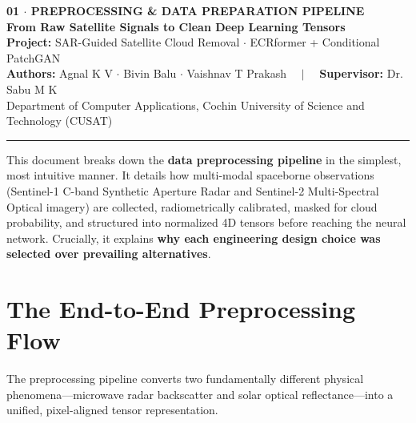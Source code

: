 \documentclass[11pt,a4paper]{article}
\begin{document}
\begin{center}
    {\LARGE \textbf{\textcolor{primary}{01 $\cdot$ PREPROCESSING \& DATA PREPARATION PIPELINE}}}\\[0.4em]
    {\large \textbf{From Raw Satellite Signals to Clean Deep Learning Tensors}}\\[0.6em]
    {\small \textbf{Project:} SAR-Guided Satellite Cloud Removal $\cdot$ ECRformer + Conditional PatchGAN}\\
    {\small \textbf{Authors:} Agnal K V $\cdot$ Bivin Balu $\cdot$ Vaishnav T Prakash $\quad|\quad$ \textbf{Supervisor:} Dr. Sabu M K}\\
    {\small Department of Computer Applications, Cochin University of Science and Technology (CUSAT)}
\end{center}
\vspace{-0.5em}
\noindent\rule{\linewidth}{1.2pt}

\vspace{0.8em}
\begin{tcolorbox}[colback=primary!5!white,colframe=primary,title=\textbf{Document Purpose \& Core Philosophy},fonttitle=\bfseries]
This document breaks down the \textbf{data preprocessing pipeline} in the simplest, most intuitive manner. It details how multi-modal spaceborne observations (Sentinel-1 C-band Synthetic Aperture Radar and Sentinel-2 Multi-Spectral Optical imagery) are collected, radiometrically calibrated, masked for cloud probability, and structured into normalized 4D tensors before reaching the neural network. Crucially, it explains \textbf{why each engineering design choice was selected over prevailing alternatives}.
\end{tcolorbox}

\section{The End-to-End Preprocessing Flow}

The preprocessing pipeline converts two fundamentally different physical phenomena---microwave radar backscatter and solar optical reflectance---into a unified, pixel-aligned tensor representation.
\end{document}
